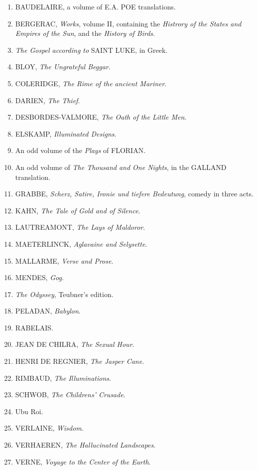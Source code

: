 \begin{enumerate}
\item BAUDELAIRE, a volume of E.A. POE translations.
\item BERGERAC, \emph{Works}, volume II, containing the \emph{Histrory of the States and Empires of the Sun}, and the \emph{History of Birds}.
\item \emph{The Gospel according to} SAINT LUKE, in Greek.
\item BLOY, \emph{The Ungrateful Beggar}.
\item COLERIDGE, \emph{The Rime of the ancient Mariner}.
\item DARIEN, \emph{The Thief}.
\item DESBORDES-VALMORE, \emph{The Oath of the Little Men}.
\item ELSKAMP, \emph{Illuminated Designs}.
\item An odd volume of the \emph{Plays} of FLORIAN\@.
\item An odd volume of \emph{The Thousand and One Nights}, in the GALLAND translation.
\item GRABBE, \emph{Scherz, Satire, Ironie und tiefere Bedeutung}, comedy in three acts.
\item KAHN, \emph{The Tale of Gold and of Silence}.
\item LAUTREAMONT, \emph{The Lays of Maldoror}.
\item MAETERLINCK, \emph{Aglavaine and Selysette}.
\item MALLARME, \emph{Verse and Prose}.
\item MENDES, \emph{Gog}.
\item \emph{The Odyssey}, Teubner's edition.
\item PELADAN, \emph{Babylon}.
\item RABELAIS\@.
\item JEAN DE CHILRA, \emph{The Sexual Hour}.
\item HENRI DE REGNIER, \emph{The Jasper Cane}.
\item RIMBAUD, \emph{The Illuminations}.
\item SCHWOB, \emph{The Childrens' Crusade}.
\item Ubu Roi.
\item VERLAINE, \emph{Wisdom}.
\item VERHAEREN, \emph{The Hallucinated Landscapes}.
\item VERNE, \emph{Voyage to the Center of the Earth}.
\end{enumerate}

